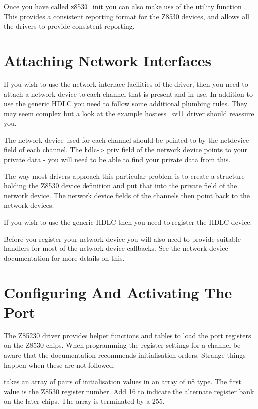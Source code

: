 \documentclass[a4paper,8pt,english]{sphinxmanual}
\begin{document}
Once you have called z8530\_init you can also make use of the utility
function {\hyperref[networking/z8530book:c.z8530_describe]{\emph{}}}. This provides a consistent
reporting format for the Z8530 devices, and allows all the drivers to
provide consistent reporting.


\section{Attaching Network Interfaces}
\label{networking/z8530book:attaching-network-interfaces}
If you wish to use the network interface facilities of the driver, then
you need to attach a network device to each channel that is present and
in use. In addition to use the generic HDLC you need to follow some
additional plumbing rules. They may seem complex but a look at the
example hostess\_sv11 driver should reassure you.

The network device used for each channel should be pointed to by the
netdevice field of each channel. The hdlc-\textgreater{} priv field of the network
device points to your private data - you will need to be able to find
your private data from this.

The way most drivers approach this particular problem is to create a
structure holding the Z8530 device definition and put that into the
private field of the network device. The network device fields of the
channels then point back to the network devices.

If you wish to use the generic HDLC then you need to register the HDLC
device.

Before you register your network device you will also need to provide
suitable handlers for most of the network device callbacks. See the
network device documentation for more details on this.


\section{Configuring And Activating The Port}
\label{networking/z8530book:configuring-and-activating-the-port}
The Z85230 driver provides helper functions and tables to load the port
registers on the Z8530 chips. When programming the register settings for
a channel be aware that the documentation recommends initialisation
orders. Strange things happen when these are not followed.

{\hyperref[networking/z8530book:c.z8530_channel_load]{\emph{}}} takes an array of pairs of
initialisation values in an array of u8 type. The first value is the
Z8530 register number. Add 16 to indicate the alternate register bank on
the later chips. The array is terminated by a 255.
\end{document}
